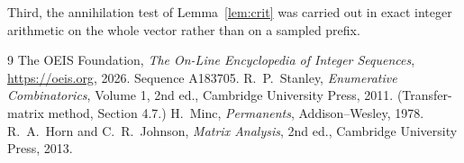 \documentclass[11pt,a4paper]{article}
\theoremstyle{plain}
\theoremstyle{definition}
\begin{document}
Third, the annihilation test of Lemma~\ref{lem:crit} was carried out in exact integer
arithmetic on the whole vector rather than on a sampled prefix.

\begin{thebibliography}{9}
 The OEIS Foundation, \emph{The On-Line Encyclopedia of Integer
Sequences}, \url{https://oeis.org}, 2026. Sequence A183705.
 R.~P.~Stanley, \emph{Enumerative Combinatorics}, Volume 1, 2nd ed.,
Cambridge University Press, 2011. (Transfer-matrix method, Section 4.7.)
 H.~Minc, \emph{Permanents}, Addison--Wesley, 1978.
 R.~A.~Horn and C.~R.~Johnson, \emph{Matrix Analysis}, 2nd ed., Cambridge
University Press, 2013.
\end{thebibliography}
\end{document}
